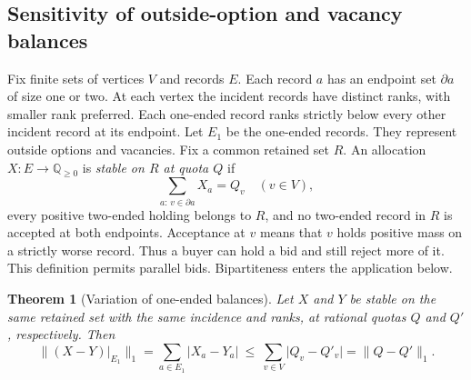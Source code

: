 \documentclass[11pt,letterpaper]{article}
\newcommand{\Rats}{\mathbb{Q}}
\newcommand{\abs}[1]{\lvert#1\rvert}
\newcommand{\normone}[1]{\lVert#1\rVert_1}
\newtheorem{theorem}{Theorem}
\begin{document}
\subsection{Sensitivity of outside-option and vacancy balances}
\label{sec:variation}

Fix finite sets of vertices $V$ and records $E$. Each record $a$ has an
endpoint set $\partial a$ of size one or two. At each vertex the incident
records have distinct ranks, with smaller rank preferred. Each one-ended
record ranks strictly below every other incident record at its endpoint.
Let $E_1$ be the one-ended records. They represent outside options and
vacancies. Fix a common retained set $R$. An allocation $X:E\to\Rats_{\ge0}$
is \emph{stable on $R$ at quota $Q$} if
\[
   \sum_{a:\,v\in\partial a}X_a=Q_v\quad(v\in V),
\]
every positive two-ended holding belongs to $R$, and no two-ended record
in $R$ is accepted at both endpoints. Acceptance at $v$ means that $v$
holds positive mass on a strictly worse record. Thus a buyer can hold a
bid and still reject more of it. This definition permits
parallel bids. Bipartiteness enters the application below.

\begin{theorem}[Variation of one-ended balances]\label{thm:variation}
Let $X$ and $Y$ be stable on the same retained set with the same incidence
and ranks, at rational quotas $Q$ and $Q'$, respectively. Then
\begin{equation}
 \normone{(X-Y)|_{E_1}}
   =\sum_{a\in E_1}\abs{X_a-Y_a}
   \ \le\ \sum_{v\in V}\abs{Q_v-Q'_v}
   =\normone{Q-Q'}.                                      \label{eq:variation}
\end{equation}
\end{theorem}
\end{document}
